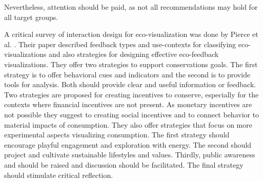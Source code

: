 Nevertheless, attention should be paid, as not all recommendations may hold for all target groups.

A critical survey of interaction design for eco-visualization was done by Pierce et al. \cite{pierce2008energy}. Their paper described feedback types and use-contexts for classifying eco-visualizations and also strategies for designing effective eco-feedback visualizations. They offer two strategies to support conservations goals. The first strategy is to offer behavioral cues and indicators and the second is to provide tools for analysis. Both should provide clear and useful information or feedback. Two strategies are proposed for creating incentives to conserve, especially for the contexts where financial incentives are not present. As monetary incentives are not possible they suggest to creating social incentives and to connect behavior to material impacts of consumption. They also offer strategies that focus on more experimental aspects visualizing consumption. The first strategy should encourage playful engagement and exploration with
energy. The second should project and cultivate sustainable lifestyles and
values. Thirdly, public awareness and should be raised and discussion should be facilitated. The final strategy should stimulate critical reflection.

